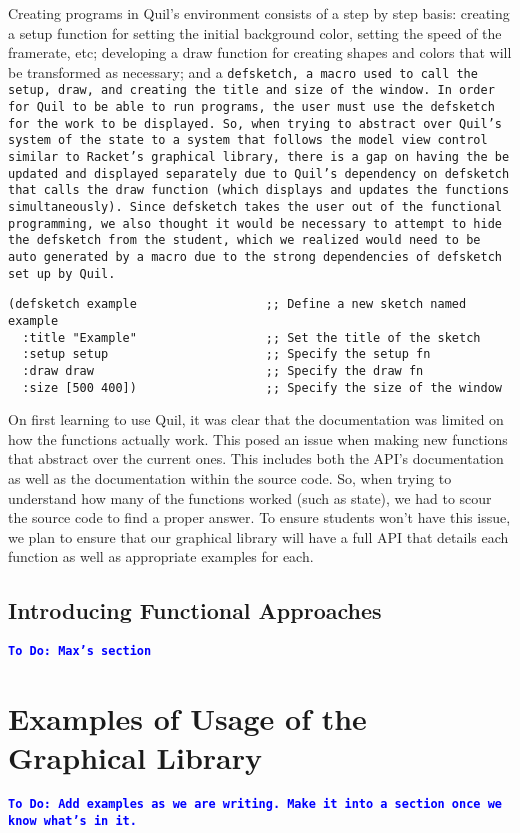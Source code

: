\documentclass[12pt]{article}
\newcommand{\comment}[1]{{\bf \tt  {#1}}}
\newcommand{\todo}[1]{\textcolor{blue}{\comment{To Do: {#1}}}}
\begin{document}
Creating programs in Quil’s environment consists of a step by step basis: creating a setup function for setting the initial background color, setting the speed of the framerate, etc; developing a draw function for creating shapes and colors that will be transformed as necessary; and a \tt{defsketch}, a macro used to call the setup, draw, and creating the title and size of the window. In order for Quil to be able to run programs, the user must use the \tt{defsketch} for the work to be displayed. So, when trying to abstract over Quil’s system of the state to a system that follows the model view control similar to Racket’s graphical library, there is a gap on having the be updated and displayed separately due to Quil’s dependency on \tt{defsketch} that calls the draw function (which displays and updates the functions simultaneously).  Since \tt{defsketch} takes the user out of the functional programming, we also thought it would be necessary to attempt to hide the \tt{defsketch} from the student, which we realized would need to be auto generated by a macro due to the strong dependencies of \tt{defsketch} set up by Quil.
\begin{verbatim} 
(defsketch example                  ;; Define a new sketch named example
  :title "Example"                  ;; Set the title of the sketch
  :setup setup                      ;; Specify the setup fn
  :draw draw                        ;; Specify the draw fn
  :size [500 400])                  ;; Specify the size of the window
\end{verbatim}
On first learning to use Quil, it was clear that the documentation was limited on how the functions actually work. This posed an issue when making new functions that abstract over the current ones. This includes both the API’s documentation as well as the documentation within the source code. So, when trying to understand how many of the functions worked (such as state), we had to scour the source code to find a proper answer. To ensure students won’t have this issue, we plan to ensure that our graphical library will have a full API that details each function as well as appropriate examples for each.  


\subsection{Introducing Functional Approaches}\label{subsec:functional}
\todo{Max's section}  

\section{Examples of Usage of the Graphical Library}\label{sec:usage}
\todo{Add examples as we are writing.  Make it into a section once we know what's in it.}
\end{document}
